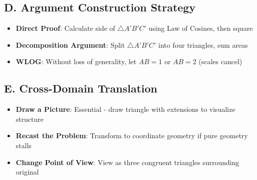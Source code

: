\documentclass[11pt]{article}
\begin{document}
\begin{strategicbox}
\subsection*{D. Argument Construction Strategy}
\begin{itemize}[leftmargin=*]
    \item \textbf{Direct Proof}: Calculate side of $\triangle A'B'C'$ using Law of Cosines, then square
    \item \textbf{Decomposition Argument}: Split $\triangle A'B'C'$ into four triangles, sum areas
    \item \textbf{WLOG}: Without loss of generality, let $AB = 1$ or $AB = 2$ (scales cancel)
\end{itemize}

\subsection*{E. Cross-Domain Translation}
\begin{itemize}[leftmargin=*]
    \item \textbf{Draw a Picture}: Essential - draw triangle with extensions to visualize structure
    \item \textbf{Recast the Problem}: Transform to coordinate geometry if pure geometry stalls
    \item \textbf{Change Point of View}: View as three congruent triangles surrounding original
\end{itemize}
\end{strategicbox}
\end{document}
